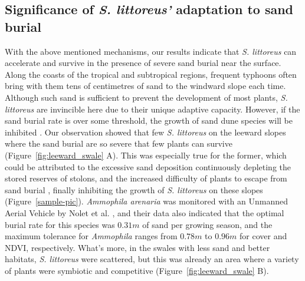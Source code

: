 \documentclass[]{interact}
\theoremstyle{plain}%
\theoremstyle{definition}
\theoremstyle{remark}
\begin{document}
\subsection{Significance of \textit{\textit{S. littoreus}'} adaptation to sand burial}

With the above mentioned mechanisms, our results indicate that \textit{S. littoreus} can accelerate and survive in the presence of severe sand burial near the surface. Along the coasts of the tropical and subtropical regions, frequent typhoons often bring with them tens of centimetres of sand to the windward slope each time. Although such sand is sufficient to prevent the development of most plants, \textit{S. littoreus} are invincible here due to their unique adaptive capacity. However, if the sand burial rate is over some threshold, the growth of sand dune species will be inhibited \citep{maunEffectsBurialSand1996, shiEffectsSandBurial2004}. Our observation showed that few \textit{S. littoreus} on the leeward slopes where the sand burial are so severe that few plants can survive (Figure~\ref{fig:leeward_swale} A). This was especially true for the former, which could be attributed to the excessive sand deposition continuously depleting the stored reserves of stolons, and the increased difficulty of plants to escape from sand burial \citep{frosiniGlobalChangeResponse2012}, finally inhibiting the growth of \textit{S. littoreus} on these slopes (Figure~\ref{sample-pic}). \textit{Ammophila arenaria} was monitored with an Unmanned Aerial Vehicle by Nolet et al. \citet{noletUAVimagingModelGrowth2018}, and their data also indicated that the optimal burial rate for this species was $0.31 m$ of sand per growing season, and the maximum tolerance for \textit{Ammophila} ranges from $0.78m$ to $0.96 m$ for cover and NDVI, respectively. What's more, in the swales with less sand and better habitats, \textit{S. littoreus} were scattered, but this was already an area where a variety of plants were symbiotic and competitive (Figure~\ref{fig:leeward_swale} B).
\end{document}
